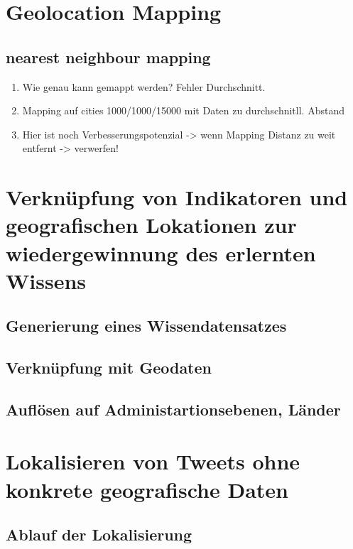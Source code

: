 	


\section{Geolocation Mapping}

	\subsection{nearest neighbour mapping}
		\begin{enumerate}
			\item {} Wie genau kann gemappt werden? Fehler Durchschnitt. 
			\item Mapping auf cities 1000/1000/15000 mit Daten zu durchschnitll. Abstand
			\item Hier ist noch Verbesserungspotenzial -> wenn Mapping Distanz zu weit entfernt -> verwerfen! 
		\end{enumerate} 

\section{Verknüpfung von Indikatoren und geografischen Lokationen zur wiedergewinnung des erlernten Wissens}
	
	\subsection{Generierung eines Wissendatensatzes}

	\subsection{Verknüpfung mit Geodaten}

	\subsection{Auflösen auf Administartionsebenen, Länder}

\section{Lokalisieren von Tweets ohne konkrete geografische Daten}
	
	\subsection{Ablauf der Lokalisierung}
	
